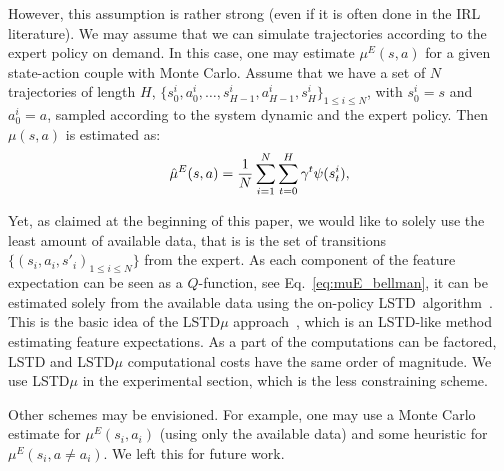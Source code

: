 \documentclass{article}
\begin{document}
However, this assumption is rather strong (even if it is often done
in the IRL literature). We may assume that we can simulate
trajectories according to the expert policy on demand. In this case,
one may estimate $\mu^E(s,a)$ for a given state-action couple with
Monte Carlo. Assume that we have a set of $N$ trajectories of length
$H$, $\{s^i_0,a^i_0,\dots,s^i_{H-1},a^i_{H-1},s^i_{H}\}_{1\leq i
\leq N}$, with $s^i_0 =s$ and $a^i_0=a$, sampled according to the
system dynamic and the expert policy. Then $\mu(s,a)$ is estimated
as:
\begin{equation}
\hat\mu^E(s,a) = {1\over
N}\sum_{i=1}^{N}\sum^{H}_{t=0}\gamma^t\psi(s^i_t),
\end{equation}

Yet, as claimed at the beginning of this paper, we would like to
solely use the least amount of available data, that is is the set of
transitions $\{(s_i,a_i,s'_{i})_{1\leq i\leq N}\}$ from the expert.
As each component of the feature expectation can be seen as a
$Q$-function, see Eq.~\eqref{eq:muE_bellman}, it can be estimated
solely from the available data using the on-policy
LSTD~algorithm~\cite{bradtke1996linear}. This is the basic idea of
the LSTD$\mu$ approach~\cite{klein2011batch}, which is an LSTD-like
method estimating feature expectations. As a part of the
computations can be factored, LSTD and LSTD$\mu$ computational costs
have the same order of magnitude. We use LSTD$\mu$ in the
experimental section, which is the less constraining scheme.

Other schemes may be envisioned. For example, one may use a Monte
Carlo estimate for $\mu^E(s_i,a_i)$ (using only the available data)
and some heuristic for $\mu^E(s_i,a\neq a_i)$. We left this for
future work.
\end{document}
